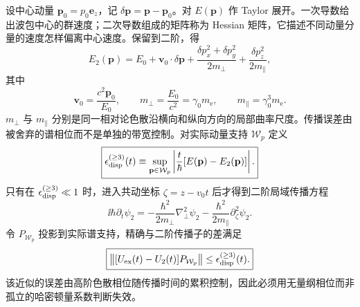 设中心动量 $\mathbf p_0=p_0\mathbf e_z$，记 $\delta\mathbf p=\mathbf p-\mathbf p_0$。对 $E(\mathbf p)$ 作 Taylor 展开。一次导数给出波包中心的群速度；二次导数组成的矩阵称为 Hessian 矩阵，它描述不同动量分量的速度怎样偏离中心速度。保留到二阶，得
\begin{equation*}
E_2(\mathbf p)
=E_0+\mathbf v_0\cdot\delta\mathbf p
+\frac{\delta p_x^2+\delta p_y^2}{2m_\perp}
+\frac{\delta p_z^2}{2m_\parallel},
\end{equation*}
其中
\begin{equation*}
\mathbf v_0=\frac{c^2\mathbf p_0}{E_0},
\qquad
m_\perp=\frac{E_0}{c^2}=\gamma_0m_{\mathrm e},
\qquad
m_\parallel=\gamma_0^3m_{\mathrm e}.
\end{equation*}
$m_\perp$ 与 $m_\parallel$ 分别是同一相对论色散沿横向和纵向方向的局部曲率尺度。传播误差由被舍弃的谱相位而不是单独的带宽控制。对实际动量支持 $\mathcal W_p$ 定义
\begin{equation}
\boxed{
\epsilon_{\rm disp}^{(\ge3)}(t)
\equiv
\sup_{\mathbf p\in\mathcal W_p}
\left|\frac{t}{\hbar}[E(\mathbf p)-E_2(\mathbf p)]\right|.}
\label{eq:dispersion_truncation_control}
\end{equation}
只有在 $\epsilon_{\rm disp}^{(\ge3)}\ll1$ 时，进入共动坐标 $\zeta=z-v_0t$ 后才得到二阶局域传播方程
\begin{equation}
\boxed{
\ii\hbar\partial_t\psi_2
=-\frac{\hbar^2}{2m_\perp}\nabla_\perp^2\psi_2
-\frac{\hbar^2}{2m_\parallel}\partial_\zeta^2\psi_2.}
\label{eq:quadratic_dispersion_local_propagation}
\end{equation}
令 $P_{\mathcal W_p}$ 投影到实际谱支持，精确与二阶传播子的差满足
\begin{equation}
\boxed{
\left\|[U_{\rm ex}(t)-U_2(t)]P_{\mathcal W_p}\right\|
\le\epsilon_{\rm disp}^{(\ge3)}(t).}
\label{eq:quadratic_dispersion_propagator_error_bound}
\end{equation}
该近似的误差由高阶色散相位随传播时间的累积控制，因此必须用无量纲相位而非孤立的哈密顿量系数判断失效。


